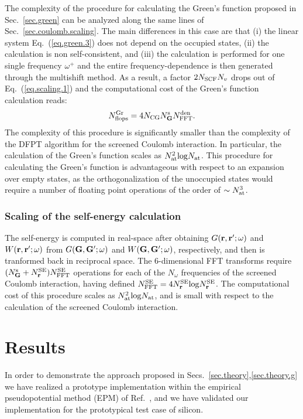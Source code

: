 \documentclass[twocolumn,prb,showpacs,superscriptaddress]{revtex4}
\def\w{\omega}
\def\G{{\bf G}}
\def\Gp{{\bf G^\prime}}
\def\r{{\bf r}}
\def\rp{{\bf r^\prime}}
\begin{document}
The complexity of the procedure for calculating the Green's function proposed
in Sec.\ \ref{sec.green} can be analyzed along the same
lines of Sec.\ \ref{sec.coulomb.scaling}. The main differences in this case are that (i) the linear system
Eq.\ (\ref{eq.green.3}) does not depend on the occupied states,
(ii) the calculation is non self-consistent, and (iii) the calculation is performed
for one single frequency $\w^+$ and the entire frequency-dependence is then generated
through the multishift method. As a result, a factor $2 N_{\rm SCF} N_v$ drops out
of Eq.\ (\ref{eq.scaling.1}) and the computational cost of the Green's function
calculation reads:
   \begin{equation}\label{eq.scaling.3}
   N^{\rm Gr}_{\rm flops} = 4 N_{\rm CG} N_\G^{\rm s} N^{\rm den}_{\rm FFT}.
   \end{equation}
The complexity of this procedure is significantly smaller than the complexity
of the DFPT algorithm for the screened Coulomb interaction. In particular, the
calculation of the Green's function scales as $N_{\rm at}^2 {\rm log} N_{\rm at}$.
This procedure for calculating the Green's function is advantageous
with respect to an expansion over empty states, as the orthogonalization
of the unoccupied states would require a number of floating point operations 
of the order of $\sim N_{\rm at}^3$.

\subsubsection{Scaling of the self-energy calculation}\label{sec.sigma.scaling}

The self-energy is computed in real-space after obtaining $G(\r,\rp;\w)$ and $W(\r,\rp;\w)$ 
from $G(\G,\Gp;\w)$ and $W(\G,\Gp;\w)$, respectively, and then is tranformed back in reciprocal space.
The 6-dimensional FFT transforms require $(N_\G^{\rm s}+N_\r^{\rm SE})N^{\rm SE}_{\rm FFT}$
operations for each of the $N_\w$ frequencies of the screened Coulomb interaction,
having defined $N^{\rm SE}_{\rm FFT}=4 N_\r^{\rm SE} {\rm log} N_\r^{\rm SE}$.
The computational cost of this procedure scales as $N_{\rm at}^2 {\rm log} N_{\rm at}$,
and is small with respect to the calculation of the screened
Coulomb interaction.

\section{Results}\label{sec.results}

In order to demonstrate the approach proposed in Secs.\ \ref{sec.theory},\ref{sec.theory.g}  we have realized a prototype implementation
within the empirical pseudopotential method (EPM) of Ref.\ ,
and we have validated our implementation for the prototypical test case of silicon.
\end{document}
